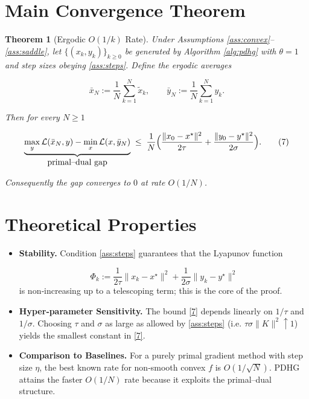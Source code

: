 \documentclass{article}
\newtheorem{theorem}{Theorem}
\begin{document}
\section*{Main Convergence Theorem}
\begin{theorem}[Ergodic $O(1/k)$ Rate]\label{thm:rate}
Under Assumptions \ref{ass:convex}–\ref{ass:saddle}, let $\{(x_{k},y_{k})\}_{k\ge0}$ be generated by Algorithm \ref{alg:pdhg} with $\theta=1$ and step sizes obeying \eqref{ass:steps}. Define the ergodic averages  

\[
\bar x_{N}:=\frac{1}{N}\sum_{k=1}^{N} \tilde x_{k},\qquad 
\bar y_{N}:=\frac{1}{N}\sum_{k=1}^{N} y_{k}.
\tag{6}
\]

Then for every $N\ge1$  

\[
\underbrace{\max_{y}\mathcal L(\bar x_{N},y)-\min_{x}\mathcal L(x,\bar y_{N})}_{\displaystyle\text{primal–dual gap}}
\;\le\;
\frac{1}{N}\Bigl(
\frac{\|x_{0}-x^{\star}\|^{2}}{2\tau}
+\frac{\|y_{0}-y^{\star}\|^{2}}{2\sigma}
\Bigr).
\tag{7}
\]

Consequently the gap converges to $0$ at rate $O(1/N)$.
\end{theorem}

\section*{Theoretical Properties}
\begin{itemize}
  \item \textbf{Stability.} Condition \eqref{ass:steps} guarantees that the Lyapunov function  

  \[
  \Phi_{k}:=\frac{1}{2\tau}\|x_{k}-x^{\star}\|^{2}+\frac{1}{2\sigma}\|y_{k}-y^{\star}\|^{2}
  \tag{8}
  \]
  is non‑increasing up to a telescoping term; this is the core of the proof.
  \item \textbf{Hyper‑parameter Sensitivity.} The bound \eqref{7} depends linearly on $1/\tau$ and $1/\sigma$. Choosing $\tau$ and $\sigma$ as large as allowed by \eqref{ass:steps} (i.e. $\tau\sigma\|K\|^{2}\uparrow1$) yields the smallest constant in \eqref{7}.
  \item \textbf{Comparison to Baselines.} For a purely primal gradient method with step size $\eta$, the best known rate for non‑smooth convex $f$ is $O(1/\sqrt{N})$. PDHG attains the faster $O(1/N)$ rate because it exploits the primal–dual structure.
\end{itemize}
\end{document}
